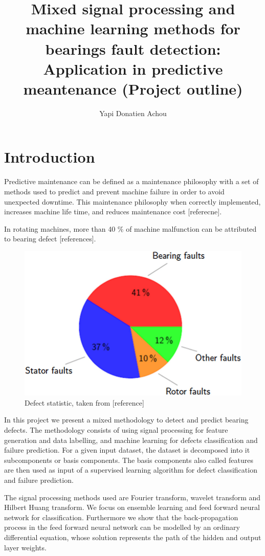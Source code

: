 \documentclass[11pt, oneside]{article}   	%
\title{Mixed signal processing and machine learning methods for bearings fault detection: Application in predictive meantenance (Project outline)}
\author{Yapi Donatien Achou}
\begin{document}
\maketitle
\tableofcontents
\newpage
\section{Introduction}
Predictive maintenance can be defined as a maintenance philosophy with a set of methods used to predict and prevent machine failure in order to avoid unexpected downtime. This maintenance philosophy when correctly implemented, increases machine life time, and reduces maintenance cost [referecne].
\begin{flushleft}
In rotating machines, more than 40 $\%$ of machine malfunction can be attributed to bearing defect [references]. 
\end{flushleft}
\begin{figure}[H] %
   \centering
   \includegraphics[width=5in]{pie.png} 
   \caption{Defect statistic, taken from [reference]}
   \label{fig:pie}
\end{figure}
In this project we present a mixed methodology to detect and predict bearing defects. The methodology consists of using signal processing for feature generation and data labelling,  and machine learning for defects classification and failure prediction. For a given input dataset, the dataset is decomposed into it subcomponents or basis components. The basis components also called features are then used as input of a supervised learning algorithm for defect classification and failure prediction.
\begin{flushleft}
The signal processing methods used are Fourier transform, wavelet transform and Hilbert Huang transform. We focus on ensemble learning and feed forward neural network for classification. Furthermore we show that the back-propagation process in the feed forward neural network can be modelled by an ordinary differential equation, whose solution represents the path of the hidden and output layer weights.
\end{flushleft}
\end{document}
